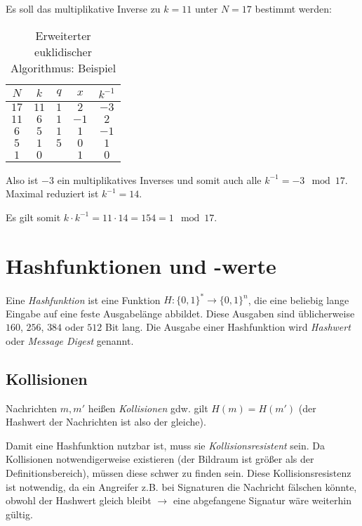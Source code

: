 				Es soll das multiplikative Inverse zu \(k = 11\) unter \(N = 17\) bestimmt werden:
				\begin{table}[H]
					\centering
					\begin{tabular}{|c|c|c|c|c|}
						\hline
						\(N\)             & \(k\)  & \(q\) & \(x\)             & \(k^{-1}\)         \\ \hline
						\(17\)            & \(11\) & \(1\) & \underline{\(2\)} & \underline{\(-3\)} \\ \hline
						\(11\)            & \(6\)  & \(1\) & \(-1\)            & \(2\)              \\ \hline
						\(6\)             & \(5\)  & \(1\) & \(1\)             & \(-1\)             \\ \hline
						\(5\)             & \(1\)  & \(5\) & \(0\)             & \(1\)              \\ \hline
						\underline{\(1\)} & \(0\)  & \(\)  & \(1\)             & \(0\)              \\ \hline
					\end{tabular}
					\caption{Erweiterter euklidischer Algorithmus: Beispiel}
				\end{table}
				Also ist \(-3\) ein multiplikatives Inverses und somit auch alle \(k^{-1} = -3 \mod 17\). Maximal reduziert ist \(k^{-1}=14\).

				Es gilt somit \(k \cdot k^{-1} = 11 \cdot 14 = 154 = 1 \mod 17\).

	\section{Hashfunktionen und -werte}
		Eine \textit{Hashfunktion} ist eine Funktion \( H : \{0,1\}^* \rightarrow \{0,1\}^n \), die eine beliebig lange Eingabe auf eine feste Ausgabelänge abbildet. Diese Ausgaben sind üblicherweise \(160\), \(256\), \(384\) oder \(512\) Bit lang. Die Ausgabe einer Hashfunktion wird \textit{Hashwert} oder \textit{Message Digest} genannt.

		\subsection{Kollisionen}
			Nachrichten \(m, m'\) heißen \textit{Kollisionen} gdw. gilt \( H(m) = H(m') \) (der Hashwert der Nachrichten ist also der gleiche).

			Damit eine Hashfunktion nutzbar ist, muss sie \textit{Kollisionsresistent} sein. Da Kollisionen notwendigerweise existieren (der Bildraum ist größer als der Definitionsbereich), müssen diese schwer zu finden sein. Diese Kollisionsresistenz ist notwendig, da ein Angreifer z.B. bei Signaturen die Nachricht fälschen könnte, obwohl der Hashwert gleich bleibt \(\rightarrow\) eine  abgefangene Signatur wäre weiterhin gültig.

